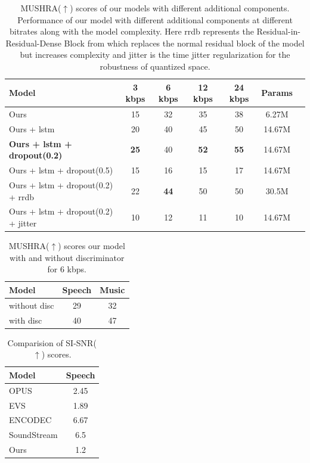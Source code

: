 \documentclass[12pt]{report}
\begin{document}
\begin{table}[H]
\centering
\captionsetup{singlelinecheck=false, font=small}
\caption{MUSHRA($\uparrow$) scores of our models with different additional components. Performance of our model with different additional components at different bitrates along with the model complexity. Here rrdb represents the Residual-in-Residual-Dense Block from \cite{kwon2020hifi} which replaces the normal residual block of the model but increases complexity and jitter is the time jitter regularization for the robustness of quantized space.}
\renewcommand{\arraystretch}{1.5}
\begin{tabular}{lcccccc}
\hline Model                              & 3 kbps    & 6 kbps    & 12 kbps    & 24 kbps    & Params   \\ 
\hline Ours                                & 15 & 32 & 35 & 38 & 6.27M  \\
Ours + lstm                                & 20 & 40 & 45 & 50 & 14.67M  \\
\textbf{Ours + lstm + dropout(0.2)}      & \textbf{25} & 40 & \textbf{52} & \textbf{55} & 14.67M  \\
Ours + lstm + dropout(0.5)               & 15 & 16 & 15 & 17 & 14.67M  \\
Ours + lstm + dropout(0.2) + rrdb        & 22 & \textbf{44} & 50 & 50 & 30.5M  \\
Ours + lstm + dropout(0.2) + jitter & 10 & 12 & 11 & 10 & 14.67M  \\
\hline
\end{tabular}
\label{tab:ourmodelcomp}
\end{table} 

\begin{table}[H]
\centering
\captionsetup{singlelinecheck=false, font=small}
\caption{MUSHRA($\uparrow$) scores our model with and without discriminator for 6 kbps.}
\renewcommand{\arraystretch}{1.5}
\begin{tabular}{lcc}
\hline Model & Speech & Music \\
\hline without disc & 29 & 32 \\
with disc & 40& 47 \\
\hline
\end{tabular}
\label{tab:disccomp}
\end{table} 

\begin{table}[H]
\centering
\captionsetup{singlelinecheck=false, font=small}
\caption{Comparision of SI-SNR($\uparrow$) scores.}
\renewcommand{\arraystretch}{1.2}
\begin{tabular}{lc}
\hline Model & Speech  \\
\hline OPUS & 2.45 \\
EVS & 1.89 \\
ENCODEC & 6.67 \\
SoundStream & 6.5 \\
Ours & 1.2 \\
\hline
\end{tabular}
\label{tab:snrcomp}
\end{table} 
\end{document}
